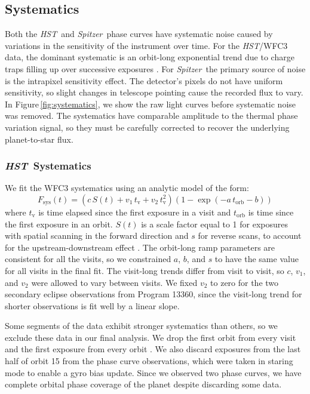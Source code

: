 \documentclass[twocolumn, trackchanges]{aastex61}
\newcommand{\project}[1]{\textsl{#1}}
\newcommand{\HST}{\project{HST}}
\newcommand{\Spitzer}{\project{Spitzer}}
\begin{document}
\subsection{Systematics}
Both the \HST\ and \Spitzer\ phase curves have systematic noise caused by variations in the sensitivity of the instrument over time. For the \HST/WFC3 data, the dominant systematic is an orbit-long exponential trend due to charge traps filling up over successive exposures \citep{long15, zhou17}. For \Spitzer\, the primary source of noise is the intrapixel sensitivity effect. The detector's pixels do not have uniform sensitivity, so slight changes in telescope pointing cause the recorded flux to vary. In Figure\,\ref{fig:systematics}, we show the raw light curves before systematic noise was removed. The systematics have comparable amplitude to the thermal phase variation signal, so they must be carefully corrected to recover the underlying planet-to-star flux. 

\subsubsection{\HST\ Systematics}
\label{sec:hst_sys}
We fit the WFC3 systematics using an analytic model of the form:
\begin{equation}
 F_\mathrm{sys}(t) = (c\,S(t) + v_1\,t_\mathrm{v} + v_2\,t_\mathrm{v}^2)(1 - \exp(-a\,t_\mathrm{orb} - b))
\end{equation}
where $t_\mathrm{v}$ is time elapsed since the first exposure in a visit and $t_\mathrm{orb}$ is time since the first exposure in an orbit. $S(t)$ is a scale factor equal to 1 for exposures with spatial scanning in the forward direction and $s$ for reverse scans, to account for the upstream-downstream effect \citep{mccullough12}. The orbit-long ramp parameters are consistent for all the visits, so we constrained $a$, $b$, and $s$ to have the same value for all visits in the final fit. The visit-long trends differ from visit to visit, so $c$, $v_1$, and $v_2$ were allowed to vary between visits. We fixed $v_2$ to zero for the two secondary eclipse observations from Program 13360, since the visit-long trend for shorter observations is fit well by a linear slope.

Some segments of the data exhibit stronger systematics than others, so we exclude these data in our final analysis. We drop the first orbit from every visit and the first exposure from every orbit \citep[following common practice; see e.g.][]{kreidberg14a}.  We also discard exposures from the last half of orbit 15 from the phase curve observations, which were taken in staring mode to enable a gyro bias update. Since we observed two phase curves, we have complete orbital phase coverage of the planet despite discarding some data.
\end{document}
